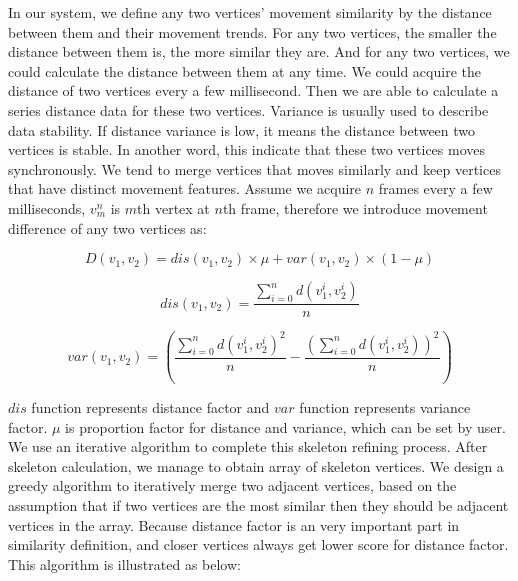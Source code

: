 \documentclass[10pt,journal,compsoc]{IEEEtran}
\begin{document}
In our system, we define any two vertices' movement similarity by the distance between them and their movement trends. For any two vertices, the smaller the distance between them is, the more similar they are. And for any two vertices, we could calculate the distance between them at any time. We could acquire the distance of two vertices every a few millisecond. Then we are able to calculate a series distance data for these two vertices. Variance is usually used to describe data stability. If distance variance is low, it means the distance between two vertices is stable. In another word, this indicate that these two vertices moves synchronously. We tend to merge vertices that moves similarly and keep vertices that have distinct movement features. Assume we acquire $n$ frames every a few milliseconds, $v_{m}^{n}$ is $m$th vertex at $n$th frame, therefore we introduce movement difference of any two vertices as:

\begin{equation}
D(v_{1}, v_{2}) = dis(v_{1}, v_{2})\times \mu + var(v_{1}, v_{2}) \times (1-\mu)
\label{eq:similarityeq}
\end{equation}

\begin{equation}
dis(v_{1}, v_{2}) = \dfrac{\sum_{i = 0}^{n}{d(v_{1}^{i}, v_{2}^{i})}}{n}
\label{eq:distance}
\end{equation}

\begin{equation}
var(v_{1}, v_{2}) = (\dfrac{\sum_{i = 0}^{n}{d(v_{1}^{i}, v_{2}^{i})}^{2}}{n} - \dfrac{(\sum_{i = 0}^{n}{d(v_{1}^{i}, v_{2}^{i})})^{2}}{n})
\label{eq:variance}
\end{equation}

$dis$ function represents distance factor and $var$ function represents variance factor. $\mu$ is proportion factor for distance and variance, which can be set by user.\\

We use an iterative algorithm to complete this skeleton refining process. After skeleton calculation, we manage to obtain array of skeleton vertices. We design a greedy algorithm to iteratively merge two adjacent vertices, based on the assumption that if two vertices are the most similar then they should be adjacent vertices in the array. Because distance factor is an very important part in similarity definition, and closer vertices always get lower score for distance factor. This algorithm is illustrated as below:\\
\end{document}
